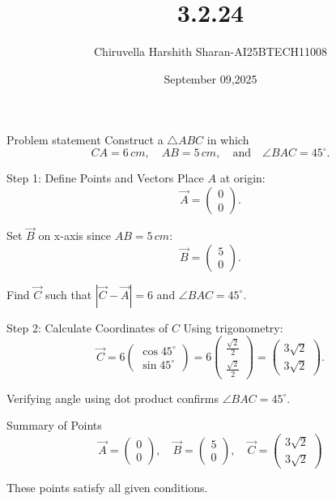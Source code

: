 \documentclass{beamer}
\title 
{3.2.24}
\date{September 09,2025}
\author 
{Chiruvella Harshith Sharan-AI25BTECH11008}
\begin{document}
\frame{\titlepage}
\begin{frame}{Problem statement}
Construct a $\triangle ABC$ in which 
\[
CA = 6\,cm, \quad AB = 5\,cm, \quad \text{and} \quad \angle BAC = 45^\circ.
\]
\end{frame}

\begin{frame}{Step 1: Define Points and Vectors}
Place $A$ at origin: 
\[
\vec{A} = \begin{pmatrix}0 \\ 0\end{pmatrix}.
\]

Set $\vec{B}$ on x-axis since $AB=5\,cm$:
\[
\vec{B} = \begin{pmatrix}5 \\ 0\end{pmatrix}.
\]

Find $\vec{C}$ such that $|\vec{C}-\vec{A}|=6$ and $\angle BAC=45^\circ$.
\end{frame}

\begin{frame}{Step 2: Calculate Coordinates of $C$}
Using trigonometry:
\[
\vec{C} = 6 \begin{pmatrix} \cos 45^\circ \\ \sin 45^\circ \end{pmatrix} 
= 6 \begin{pmatrix} \frac{\sqrt{2}}{2} \\ \frac{\sqrt{2}}{2} \end{pmatrix} 
= \begin{pmatrix} 3\sqrt{2} \\ 3\sqrt{2} \end{pmatrix}.
\]

Verifying angle using dot product confirms $\angle BAC = 45^\circ$.
\end{frame}

\begin{frame}{Summary of Points}
\[
\boxed{
\vec{A} = \begin{pmatrix}0 \\ 0\end{pmatrix}, \quad
\vec{B} = \begin{pmatrix}5 \\ 0\end{pmatrix}, \quad
\vec{C} = \begin{pmatrix}3\sqrt{2} \\ 3\sqrt{2}\end{pmatrix}
}
\]

These points satisfy all given conditions.
\end{frame}
\end{document}

